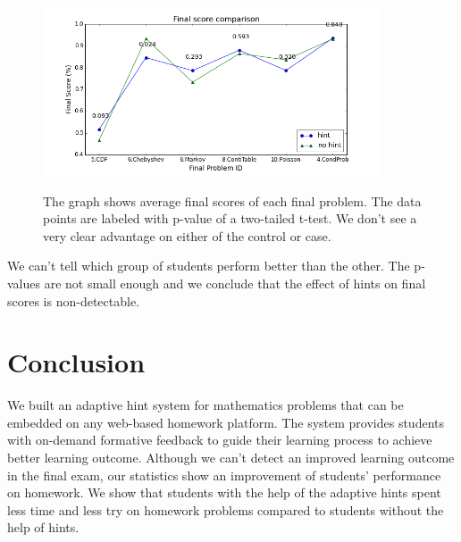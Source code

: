\documentclass{llncs}
\begin{document}
\begin{figure}[h]
\centering
\caption{The graph shows average final scores of each final problem. The data points are labeled with p-value of a two-tailed t-test. We don't see a very clear advantage on either of the control or case.}
\includegraphics[width=0.8\linewidth, height=5cm]{image/final_compare.png}
\label{fig:final_compare_all}
\end{figure}

We can't tell which group of students perform better than the other. The p-values are not small enough and we conclude that the effect of hints on final scores is non-detectable.


\section{Conclusion}
We built an adaptive hint system for mathematics problems that can be embedded on any web-based homework platform. The system provides students with on-demand formative feedback to guide their learning process to achieve better learning outcome. Although we can't detect an improved learning outcome in the final exam, our statistics show an improvement of students' performance on homework. We show that students with the help of the adaptive hints spent less time and less try on homework problems compared to students without the help of hints.

\newpage


\end{document}
